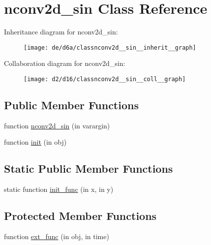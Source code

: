 \hypertarget{classnconv2d__sin}{}\section{nconv2d\+\_\+sin Class Reference}
\label{classnconv2d__sin}


Inheritance diagram for nconv2d\+\_\+sin\+:
\nopagebreak
\begin{figure}[H]
\begin{center}
\leavevmode
\texttt{[image: de/d6a/classnconv2d\_\_sin\_\_inherit\_\_graph]}
\end{center}
\end{figure}


Collaboration diagram for nconv2d\+\_\+sin\+:
\nopagebreak
\begin{figure}[H]
\begin{center}
\leavevmode
\texttt{[image: d2/d16/classnconv2d\_\_sin\_\_coll\_\_graph]}
\end{center}
\end{figure}
\subsection*{Public Member Functions}
\begin{DoxyCompactItemize}
\item 
function \hyperlink{classnconv2d__sin_a7eb9db9fedc4ba124857dae40738fb90}{nconv2d\+\_\+sin} (in varargin)
\item 
function \hyperlink{classnconv2d__sin_a97f07ebf5588db218f545f1ddd8062ec}{init} (in obj)
\end{DoxyCompactItemize}
\subsection*{Static Public Member Functions}
\begin{DoxyCompactItemize}
\item 
static function \hyperlink{classnconv2d__sin_a28faa20a3a56cd56bd4dc1638f67e6c4}{init\+\_\+func} (in x, in y)
\end{DoxyCompactItemize}
\subsection*{Protected Member Functions}
\begin{DoxyCompactItemize}
\item 
function \hyperlink{classnconv2d__sin_ac8e1d291292e8edc847802354d1b211b}{ext\+\_\+func} (in obj, in time)
\end{DoxyCompactItemize}
